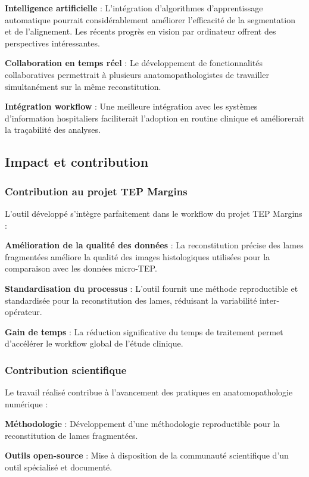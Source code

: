 \documentclass[12pt,a4paper]{report}
\begin{document}
\begin{}
\begin{}
\begin{}
\begin{}
\textbf{Intelligence artificielle} : L'intégration d'algorithmes d'apprentissage automatique pourrait considérablement améliorer l'efficacité de la segmentation et de l'alignement. Les récents progrès en vision par ordinateur offrent des perspectives intéressantes.

\textbf{Collaboration en temps réel} : Le développement de fonctionnalités collaboratives permettrait à plusieurs anatomopathologistes de travailler simultanément sur la même reconstitution.

\textbf{Intégration workflow} : Une meilleure intégration avec les systèmes d'information hospitaliers faciliterait l'adoption en routine clinique et améliorerait la traçabilité des analyses.

\subsection{Impact et contribution}

\subsubsection{Contribution au projet TEP Margins}

L'outil développé s'intègre parfaitement dans le workflow du projet TEP Margins :

\textbf{Amélioration de la qualité des données} : La reconstitution précise des lames fragmentées améliore la qualité des images histologiques utilisées pour la comparaison avec les données micro-TEP.

\textbf{Standardisation du processus} : L'outil fournit une méthode reproductible et standardisée pour la reconstitution des lames, réduisant la variabilité inter-opérateur.

\textbf{Gain de temps} : La réduction significative du temps de traitement permet d'accélérer le workflow global de l'étude clinique.

\subsubsection{Contribution scientifique}

Le travail réalisé contribue à l'avancement des pratiques en anatomopathologie numérique :

\textbf{Méthodologie} : Développement d'une méthodologie reproductible pour la reconstitution de lames fragmentées.

\textbf{Outils open-source} : Mise à disposition de la communauté scientifique d'un outil spécialisé et documenté.


\end{}
\end{}
\end{}
\end{}
\end{document}
